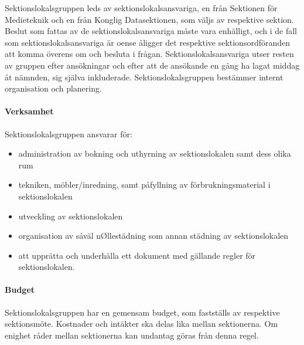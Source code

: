 \documentclass[a4paper,12pt]{article}
\begin{document}
Sektionslokalsgruppen leds av sektionslokalsansvariga, en från Sektionen för Medieteknik och en från Konglig Datasektionen, som väljs av respektive sektion. Beslut som fattas av de sektionslokalsansvariga måste vara enhälligt, och i de fall som sektionslokalsansvariga är oense åligger det respektive sektionsordföranden att komma överens
om och besluta i frågan. Sektionslokalsansvariga utser resten av gruppen efter ansökningar och efter att de ansökande en gång ha lagat middag åt nämnden, sig själva inkluderade. Sektionslokalsgruppen bestämmer internt organisation och planering.

\paragraph{Verksamhet}

Sektionslokalsgruppen ansvarar för:

\begin{itemize}
  \item administration av bokning och uthyrning av sektionslokalen samt dess olika rum
\end{itemize}

\begin{itemize}
  \item tekniken, möbler/inredning, samt påfyllning av förbrukningsmaterial i sektionslokalen
\end{itemize}

\begin{itemize}
  \item utveckling av sektionslokalen
\end{itemize}

\begin{itemize}
  \item organisation av såväl nØllestädning som annan städning av sektionslokalen
\end{itemize}

\begin{itemize}
  \item att upprätta och underhålla ett dokument med gällande regler för sektionslokalen.
\end{itemize}

\paragraph{Budget}

Sektionslokalsgruppen har en gemensam budget, som fastställs av respektive sektionsmöte. Kostnader och intäkter ska delas lika mellan sektionerna. Om enighet råder mellan sektionerna kan undantag göras från denna regel.
\end{document}
